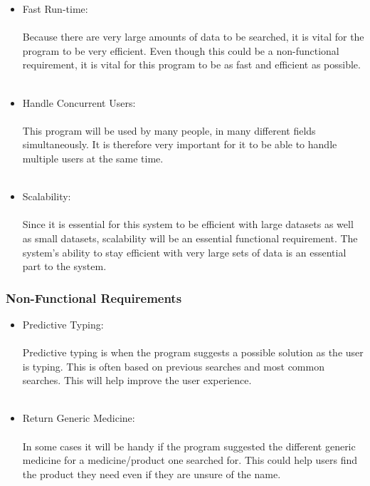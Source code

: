 \documentclass[a4paper,10pt]{article}
\begin{document}
{\begin{itemize}
		\item Fast Run-time:\\\\
			Because there are very large amounts of data to be searched, it is vital for the program to be very efficient.  Even though this could be a non-functional requirement, it is vital for this program to be as fast and efficient as possible.\\\\
	
		\item Handle Concurrent Users:\\\\
			This program will be used by many people, in many different fields simultaneously. It is therefore very important for it to be able to handle multiple users at the same time.\\\\
	
		\item Scalability:\\\\
			Since it is essential for this system to be efficient with large datasets as well as small datasets, scalability will be an essential functional requirement. The system’s ability to stay efficient with very large sets of data is an essential part to the system.
		 \end{itemize}

	\subsubsection{Non-Functional Requirements}
		\begin{itemize}
		\item Predictive Typing:\\\\
			Predictive typing is when the program suggests a possible solution as the user is typing. This is often based on previous searches and most common searches. This will help improve the user experience. \\\\

		\item Return Generic Medicine:\\\\
			In some cases it will be handy if the program suggested the different generic medicine for a medicine/product one searched for. This could help users find the product they need even if they are unsure of the name.
	

\end{itemize}}
\end{document}
